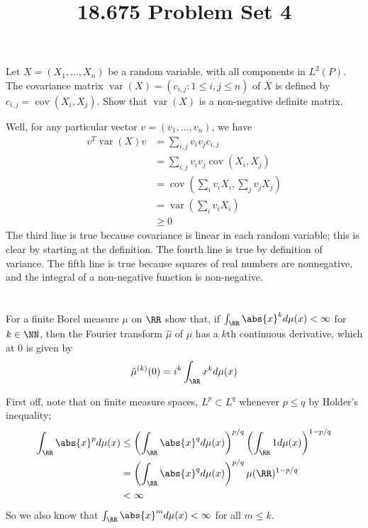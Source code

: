 \documentclass[11pt, headheight=30pt]{scrartcl}
\title{18.675 Problem Set 4}
\DeclareMathOperator{\cov}{cov}
\DeclareMathOperator{\var}{var}
\begin{document}
\section{}
\begin{prob}
Let $X = (X_1, \dots, X_n)$ be a random variable,
with all components in $L^2(P)$. The covariance
matrix $\var(X) = (c_{i,j} : 1 \leq i, j \leq n)$
of $X$ is defined by $c_{i,j} = \cov(X_i, X_j)$.
Show that $\var(X)$ is a non-negative definite matrix.
\end{prob}

Well, for any particular vector $v = (v_1, \dots, v_n)$,
we have
\begin{align*}
    v^T \var(X) v &= \sum_{i,j} v_i v_j c_{i,j} \\
    &= \sum_{i,j} v_i v_j \cov(X_i, X_j) \\
    &= \cov\left( \sum_i v_i X_i, \sum_j v_j X_j \right) \\
    &= \var\left( \sum_i v_i X_i \right) \\
    &\geq 0
\end{align*}
The third line is true because covariance is linear
in each random variable; this is clear by starting at the definition.
The fourth line is true by definition of variance. The
fifth line is true because squares of real numbers
are nonnegative, and the integral of a non-negative
function is non-negative.


\section{}
\begin{prob}
For a finite Borel measure $\mu$ on $\RR$ show that,
if $\int_\RR \abs{x}^k d\mu(x) < \infty$ for $k \in \NN$,
then the Fourier transform $\hat{\mu}$ of $\mu$ has a
$k$th continuous derivative, which at $0$ is given by
\[
    \hat{\mu}^{(k)}(0) = i^k \int_\RR x^k d\mu(x)
\]
\end{prob}

First off, note that on finite measure spaces, $L^p \subset L^q$
whenever $p \leq q$ by Holder's inequality;
\begin{align*}
    \int_\RR \abs{x}^p d\mu(x) &\leq \left(\int_\RR \abs{x}^q d\mu(x)\right)^{p/q} \left(\int_\RR 1 d\mu(x)\right)^{1 - p/q} \\
    &= \left(\int_\RR \abs{x}^q d\mu(x)\right)^{p/q} \mu(\RR)^{1 - p/q} \\
    &< \infty
\end{align*}
So we also know that $\int_\RR \abs{x}^m d\mu(x) < \infty$ for all $m \leq k$.
\end{document}
